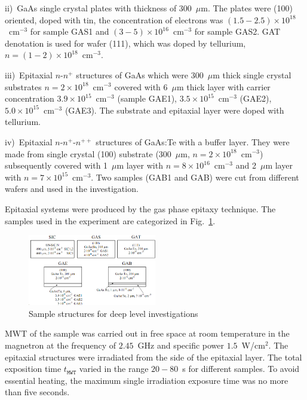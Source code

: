\documentclass[final,3p,times,twocolumn,authoryear]{elsarticle}
\begin{document}
\noindent
ii)~GaAs single crystal plates with thickness of 300~$\mu$m.
   The plates were (100) oriented, doped with tin, the concentration of electrons was $(1.5-2.5)\times10^{18}$~cm$^{-3}$
   for sample  GAS1 and $(3-5)\times10^{16}$~cm$^{-3}$ for sample GAS2.
   GAT denotation is used for wafer (111), which was doped by tellurium,  $n = (1-2)\times10^{18}$~cm$^{-3}$.

\noindent
iii)~Epitaxial $n$-$n^+$ structures of GaAs which were 300~$\mu$m thick single crystal substrates $n = 2 \times10^{18}$~cm$^{-3}$
   covered with 6~$\mu$m thick layer with carrier concentration $3.9\times10^{15}$~cm$^{-3}$
   (sample GAE1), $3.5\times10^{15}$~cm$^{-3}$ (GAE2),
   $5.0\times10^{15}$~cm$^{-3}$ (GAE3).
   The substrate and epitaxial layer were doped with tellurium.

\noindent
iv)~Epitaxial $n$-$n^+$-$n^{++}$ structures of GaAs:Te with a buffer layer.
 They were made from single crystal (100) substrate (300~$\mu$m, $n= 2\times10^{18}$~cm$^{-3}$)
  subsequently covered with 1~$\mu$m layer with $n=8\times10^{16}$~cm$^{-3}$ and
  2~$\mu$m layer with $n=7\times10^{15}$~cm$^{-3}$.
  Two samples (GAB1 and GAB) were cut from different wafers and used in the investigation.

Epitaxial systems were produced by the gas phase epitaxy technique.
The samples used in the experiment are categorized in Fig.~\ref{figSamp_TAV}.

\begin{figure}
\center
\includegraphics[width=0.5\textwidth]{Fig1}
\caption{\label{figSamp_TAV}
Sample structures for deep level investigations}%
\end{figure}

MWT of the sample was carried out in free space at room temperature in the magnetron at the frequency of  $2.45$~GHz
and specific power $1.5$~W/cm$^{2}$.
The epitaxial structures were irradiated from the side of the epitaxial layer.
The total exposition time $t_\mathtt{MWT}$ varied in the range $20-80$~s for different samples.
To avoid essential heating, the maximum single irradiation exposure time was no more than  five seconds.
\end{document}
